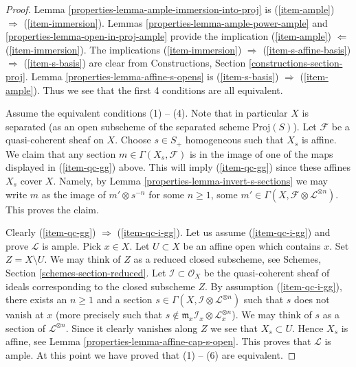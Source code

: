 \begin{proof}

Lemma \ref{properties-lemma-ample-immersion-into-proj} is
(\ref{item-ample}) $\Rightarrow$ (\ref{item-immersion}).
Lemmas \ref{properties-lemma-ample-power-ample} and \ref{properties-lemma-open-in-proj-ample}
provide the implication
(\ref{item-ample}) $\Leftarrow$ (\ref{item-immersion}).
The implications (\ref{item-immersion}) $\Rightarrow$
(\ref{item-s-affine-basis}) $\Rightarrow$ (\ref{item-s-basis})
are clear from Constructions, Section \ref{constructions-section-proj}.
Lemma \ref{properties-lemma-affine-s-opens} is
(\ref{item-s-basis}) $\Rightarrow$ (\ref{item-ample}).
Thus we see that the first 4 conditions are all equivalent.

\medskip\noindent
Assume the equivalent conditions (1) -- (4).
Note that in particular $X$ is separated (as an open
subscheme of the separated scheme $\text{Proj}(S)$).
Let $\mathcal{F}$ be a quasi-coherent sheaf on $X$.
Choose $s \in S_{+}$ homogeneous such that $X_s$ is affine.
We claim that any section $m \in \Gamma(X_s, \mathcal{F})$
is in the image of one of the maps displayed in
(\ref{item-qc-gg}) above. This will imply (\ref{item-qc-gg})
since these affines $X_s$ cover $X$.
Namely, by Lemma \ref{properties-lemma-invert-s-sections} we may write
$m$ as the image of $m' \otimes s^{-n}$ for some
$n \geq 1$, some
$m' \in \Gamma(X, \mathcal{F} \otimes \mathcal{L}^{\otimes n})$.
This proves the claim.

\medskip\noindent
Clearly (\ref{item-qc-gg}) $\Rightarrow$ (\ref{item-qc-i-gg}).
Let us assume (\ref{item-qc-i-gg}) and prove $\mathcal{L}$ is
ample. Pick $x \in X$. Let $U \subset X$ be an affine open
which contains $x$. Set $Z = X \setminus U$. We may think of
$Z$ as a reduced closed subscheme, see
Schemes, Section \ref{schemes-section-reduced}.
Let $\mathcal{I} \subset \mathcal{O}_X$ be the quasi-coherent
sheaf of ideals corresponding to the closed subscheme $Z$.
By assumption (\ref{item-qc-i-gg}), there exists an $n \geq 1$ and a section
$s \in \Gamma(X, \mathcal{I} \otimes \mathcal{L}^{\otimes n})$
such that $s$ does not vanish at $x$ (more precisely such that
$s \not \in \mathfrak m_x \mathcal{I}_x \otimes \mathcal{L}_x^{\otimes n}$).
We may think of $s$ as a section of $\mathcal{L}^{\otimes n}$.
Since it clearly vanishes along $Z$ we see that
$X_s \subset U$. Hence $X_s$ is affine, see
Lemma \ref{properties-lemma-affine-cap-s-open}.
This proves that $\mathcal{L}$ is ample.
At this point we have proved that (1) -- (6) are equivalent.


\end{proof}
